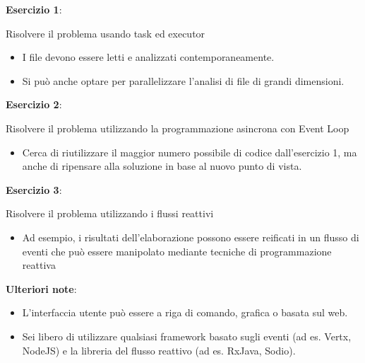 \documentclass[a4paper]{article}
\begin{document}
\textbf{Esercizio 1}:

Risolvere il problema usando task ed executor

        \begin{itemize}

            \item I file devono essere letti e analizzati contemporaneamente.

            \item Si pu\`o anche optare per parallelizzare l'analisi di file di grandi dimensioni.

        \end{itemize}

\textbf{Esercizio 2}:

Risolvere il problema utilizzando la programmazione asincrona con Event Loop

        \begin{itemize}

            \item Cerca di riutilizzare il maggior numero possibile di codice dall'esercizio 1, ma anche di ripensare alla soluzione in base al nuovo punto di vista.

        \end{itemize}

\textbf{Esercizio 3}:

Risolvere il problema utilizzando i flussi reattivi

        \begin{itemize}

            \item Ad esempio, i risultati dell'elaborazione possono essere reificati in un flusso di eventi che pu\`o essere manipolato mediante tecniche di programmazione reattiva

        \end{itemize}

\textbf{Ulteriori note}:

\begin{itemize}

    \item L'interfaccia utente pu\`o essere a riga di comando, grafica o basata sul web.
%

    \item Sei libero di utilizzare qualsiasi framework basato sugli eventi (ad es.
%
Vertx, NodeJS) e la libreria del flusso reattivo (ad es.
%
RxJava, Sodio).

\end{itemize}
\end{document}
